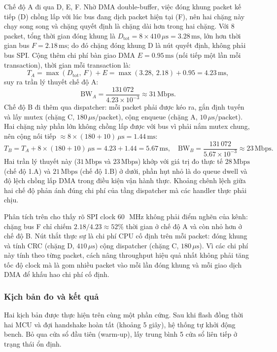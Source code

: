 Chế độ A đi qua D, E, F. Nhờ DMA double-buffer, việc đóng khung packet kế tiếp (D) chồng lấp với lúc bus đang dịch packet hiện tại (F), nên hai chặng này chạy song song và chặng quyết định là chặng dài hơn trong hai chặng. Với 8 packet, tổng thời gian đóng khung là $D_\text{tot} = 8\times410\,\mu\text{s} = 3{.}28\,\text{ms}$, lớn hơn thời gian bus $F = 2{.}18\,\text{ms}$; do đó chặng đóng khung D là nút quyết định, không phải bus SPI. Cộng thêm chi phí bàn giao DMA $E = 0{.}95\,\text{ms}$ (nối tiếp một lần mỗi transaction), thời gian mỗi transaction là:
\[
T_A = \max(D_\text{tot},\, F) + E = \max(3{.}28,\ 2{.}18) + 0{.}95 = 4{.}23\,\text{ms},
\]
suy ra trần lý thuyết chế độ A:
\[
\text{BW}_A = \frac{131\,072}{4{.}23\times10^{-3}} \approx 31\,\text{Mbps}.
\]
Chế độ B đi thêm qua dispatcher: mỗi packet phải được kéo ra, gắn định tuyến và lấy mutex (chặng C, $180\,\mu\text{s/packet}$), cộng enqueue (chặng A, $10\,\mu\text{s/packet}$). Hai chặng này phần lớn không chồng lấp được với bus vì phải nắm mutex chung, nên cộng nối tiếp $\approx 8\times(180+10)\,\mu\text{s} = 1{.}44\,\text{ms}$:
\[
T_B = T_A + 8\times(180+10)\,\mu\text{s} = 4{.}23 + 1{.}44 = 5{.}67\,\text{ms},
\quad
\text{BW}_B = \frac{131\,072}{5{.}67\times10^{-3}} \approx 23\,\text{Mbps}.
\]
Hai trần lý thuyết này ($31\,\text{Mbps}$ và $23\,\text{Mbps}$) khớp với giá trị đo thực tế $28\,\text{Mbps}$ (chế độ 1.A) và $21\,\text{Mbps}$ (chế độ 1.B) ở dưới, phần hụt nhỏ là do queue dwell và độ lệch chồng lấp DMA trong điều kiện vận hành thực. Khoảng chênh lệch giữa hai chế độ phản ánh đúng chi phí của tầng dispatcher mà các handler thực phải chịu.

Phân tích trên cho thấy rõ SPI clock 60~\,MHz không phải điểm nghẽn của kênh: chặng bus F chỉ chiếm $2{.}18/4{.}23 \approx 52\%$ thời gian ở chế độ A và còn nhỏ hơn ở chế độ B. Nút thắt thực sự là chi phí CPU cố định trên mỗi packet: đóng khung và tính CRC (chặng D, $410\,\mu\text{s}$) cộng dispatcher (chặng C, $180\,\mu\text{s}$). Vì các chi phí này tính theo từng packet, cách nâng throughput hiệu quả nhất không phải tăng tốc độ clock mà là gom nhiều packet vào mỗi lần đóng khung và mỗi giao dịch DMA để khấu hao chi phí cố định.

\subsubsection{Kịch bản đo và kết quả}

Hai kịch bản được thực hiện trên cùng một phần cứng. Sau khi flash đồng thời hai MCU và đợi handshake hoàn tất (khoảng 5 giây), hệ thống tự khởi động bench. Bỏ qua cửa sổ đầu tiên (warm-up), lấy trung bình 5 cửa sổ liên tiếp ở trạng thái ổn định.

